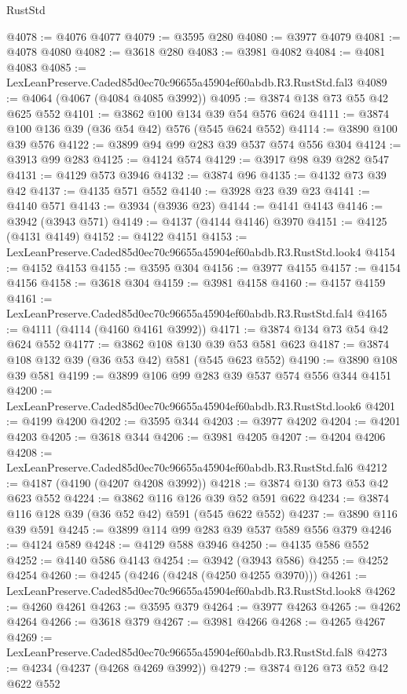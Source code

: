 \begin{lexlean}{RustStd}
\begin{coremodule}
@4078 := @4076 @4077
@4079 := @3595 @280
@4080 := @3977 @4079
@4081 := @4078 @4080
@4082 := @3618 @280
@4083 := @3981 @4082
@4084 := @4081 @4083
@4085 := LexLeanPreserve.Caded85d0ec70c96655a45904ef60abdb.R3.RustStd.fal3
@4089 := @4064 (@4067 (@4084 @4085 @3992))
@4095 := @3874 @138 @73 @55 @42 @625 @552
@4101 := @3862 @100 @134 @39 @54 @576 @624
@4111 := @3874 @100 @136 @39 (@36 @54 @42) @576 (@545 @624 @552)
@4114 := @3890 @100 @39 @576
@4122 := @3899 @94 @99 @283 @39 @537 @574 @556 @304
@4124 := @3913 @99 @283
@4125 := @4124 @574
@4129 := @3917 @98 @39 @282 @547
@4131 := @4129 @573 @3946
@4132 := @3874 @96
@4135 := @4132 @73 @39 @42
@4137 := @4135 @571 @552
@4140 := @3928 @23 @39 @23
@4141 := @4140 @571
@4143 := @3934 (@3936 @23)
@4144 := @4141 @4143
@4146 := @3942 (@3943 @571)
@4149 := @4137 (@4144 @4146) @3970
@4151 := @4125 (@4131 @4149)
@4152 := @4122 @4151
@4153 := LexLeanPreserve.Caded85d0ec70c96655a45904ef60abdb.R3.RustStd.look4
@4154 := @4152 @4153
@4155 := @3595 @304
@4156 := @3977 @4155
@4157 := @4154 @4156
@4158 := @3618 @304
@4159 := @3981 @4158
@4160 := @4157 @4159
@4161 := LexLeanPreserve.Caded85d0ec70c96655a45904ef60abdb.R3.RustStd.fal4
@4165 := @4111 (@4114 (@4160 @4161 @3992))
@4171 := @3874 @134 @73 @54 @42 @624 @552
@4177 := @3862 @108 @130 @39 @53 @581 @623
@4187 := @3874 @108 @132 @39 (@36 @53 @42) @581 (@545 @623 @552)
@4190 := @3890 @108 @39 @581
@4199 := @3899 @106 @99 @283 @39 @537 @574 @556 @344 @4151
@4200 := LexLeanPreserve.Caded85d0ec70c96655a45904ef60abdb.R3.RustStd.look6
@4201 := @4199 @4200
@4202 := @3595 @344
@4203 := @3977 @4202
@4204 := @4201 @4203
@4205 := @3618 @344
@4206 := @3981 @4205
@4207 := @4204 @4206
@4208 := LexLeanPreserve.Caded85d0ec70c96655a45904ef60abdb.R3.RustStd.fal6
@4212 := @4187 (@4190 (@4207 @4208 @3992))
@4218 := @3874 @130 @73 @53 @42 @623 @552
@4224 := @3862 @116 @126 @39 @52 @591 @622
@4234 := @3874 @116 @128 @39 (@36 @52 @42) @591 (@545 @622 @552)
@4237 := @3890 @116 @39 @591
@4245 := @3899 @114 @99 @283 @39 @537 @589 @556 @379
@4246 := @4124 @589
@4248 := @4129 @588 @3946
@4250 := @4135 @586 @552
@4252 := @4140 @586 @4143
@4254 := @3942 (@3943 @586)
@4255 := @4252 @4254
@4260 := @4245 (@4246 (@4248 (@4250 @4255 @3970)))
@4261 := LexLeanPreserve.Caded85d0ec70c96655a45904ef60abdb.R3.RustStd.look8
@4262 := @4260 @4261
@4263 := @3595 @379
@4264 := @3977 @4263
@4265 := @4262 @4264
@4266 := @3618 @379
@4267 := @3981 @4266
@4268 := @4265 @4267
@4269 := LexLeanPreserve.Caded85d0ec70c96655a45904ef60abdb.R3.RustStd.fal8
@4273 := @4234 (@4237 (@4268 @4269 @3992))
@4279 := @3874 @126 @73 @52 @42 @622 @552

\end{coremodule}
\end{lexlean}
